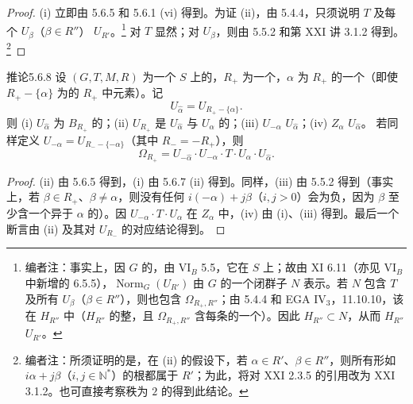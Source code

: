 \begin{proof}
(i) 立即由 5.6.5 和 5.6.1 (vi) 得到。为证 (ii)，由 5.4.4，只须说明 $T$ 及每个 $U_\beta$（$\beta\in R''$） $U_{R'}$。\footnote{编者注：事实上，因 $G$ 的，由 VI$_B$ 5.5，它在 $S$ 上；故由 XI 6.11（亦见 VI$_B$ 中新增的 6.5.5），$\operatorname{Norm}_G(U_{R'})$ 由 $G$ 的一个闭群子 $N$ 表示。若 $N$ 包含 $T$ 及所有 $U_\beta$（$\beta\in R''$），则也包含 $\Omega_{R_+,R''}$；由 5.4.4 和 EGA IV$_3$，11.10.10，该在 $H_{R''}$ 中（$H_{R''}$ 的整，且 $\Omega_{R_+,R''}$ 含每条的一个）。因此 $H_{R''}\subset N$，从而 $H_{R''}$  $U_{R'}$。} 对 $T$ 显然；对 $U_\beta$，则由 5.5.2 和第 XXI 讲 3.1.2 得到。\footnote{编者注：所须证明的是，在 (ii) 的假设下，若 $\alpha\in R'$、$\beta\in R''$，则所有形如 $i\alpha+j\beta$（$i,j\in\mathbb N^*$）的根都属于 $R'$；为此，将对 XXI 2.3.5 的引用改为 XXI 3.1.2。也可直接考察秩为 $2$ 的得到此结论。}
\end{proof}
\begin{SGAresult}{推论}{5.6.8}
设 $(G,T,M,R)$ 为一个 $S$ 上的，$R_+$ 为一个，$\alpha$ 为 $R_+$ 的一个（即使 $R_+-\{\alpha\}$ 为的 $R_+$ 中元素）。记
\[U_{\widehat\alpha}=U_{R_+-\{\alpha\}}.\]
则 (i) $U_{\widehat\alpha}$ 为 $B_{R_+}$ 的；(ii) $U_{R_+}$ 是 $U_{\widehat\alpha}$ 与 $U_\alpha$ 的；(iii) $U_{-\alpha}$  $U_{\widehat\alpha}$；(iv) $Z_\alpha$  $U_{\widehat\alpha}$。
若同样定义 $U_{-\widehat\alpha}=U_{R_--\{-\alpha\}}$（其中 $R_-=-R_+$），则
\[\Omega_{R_+}=U_{-\widehat\alpha}\cdot U_{-\alpha}\cdot T\cdot U_\alpha\cdot U_{\widehat\alpha}.\]
\end{SGAresult}
\begin{proof}
(ii) 由 5.6.5 得到，(i) 由 5.6.7 (ii) 得到。同样，(iii) 由 5.5.2 得到（事实上，若 $\beta\in R_+$、$\beta\ne\alpha$，则没有任何 $i(-\alpha)+j\beta$（$i,j>0$）会为负，因为 $\beta$ 至少含一个异于 $\alpha$ 的）。因 $U_{-\alpha}\cdot T\cdot U_\alpha$ 在 $Z_\alpha$ 中，(iv) 由 (i)、(iii) 得到。最后一个断言由 (ii) 及其对 $U_{R_-}$ 的对应结论得到。
\end{proof}
